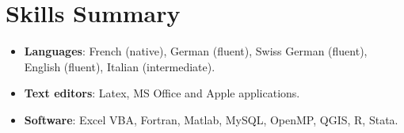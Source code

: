 \documentclass[letterpaper,10.8pt]{article}
\newcommand{\resumeItem}[2]{
  \item\small{
    \textbf{#1}{: #2 \vspace{-2pt}}
  }
}
\newcommand{\resumeSubItem}[2]{\resumeItem{#1}{#2}\vspace{-4pt}}
\newcommand{\resumeSubHeadingListStart}{\begin{itemize}[leftmargin=*]}
\newcommand{\resumeSubHeadingListEnd}{\end{itemize}}
\begin{document}
%
\section{Skills Summary}
	\resumeSubHeadingListStart
	\resumeSubItem{Languages}{French (native), German (fluent), Swiss German (fluent), English (fluent), Italian (intermediate).}
	\resumeSubItem{Text editors}{Latex, MS Office and Apple applications.}
	\resumeSubItem{Software}{Excel VBA, Fortran, Matlab, MySQL, OpenMP, QGIS, R, Stata.}
\resumeSubHeadingListEnd

\end{document}
